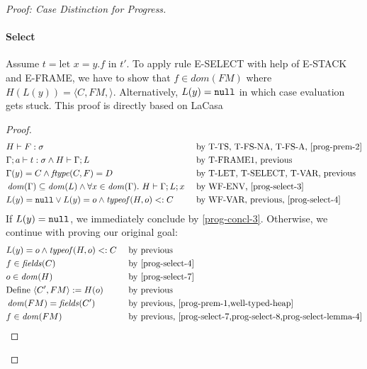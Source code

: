 \begin{proof}[Proof: Case Distinction for Progress]
\paragraph{Select}
Assume $t = \text{let } x = y.f \text{ in } t'$. To apply rule E-SELECT with help of E-STACK and E-FRAME, we have to show that $f \in dom(FM)$ where $H(L(y)) = \langle C, FM, \rangle$. Alternatively, $L(y) = \texttt{null}$ in which case evaluation gets stuck. This proof is directly based on LaCasa~\cite{haller_lacasa_2016}

\begin{proof}
\begin{alignat}{3}
    &H \vdash F : \sigma
        && \text{ by T-TS, T-FS-NA, T-FS-A, \cref{prog-prem-2}}\\
    &\Gamma; a \vdash t : \sigma
    \wedge H \vdash \Gamma; L \label{prog-select-3}
        && \text{ by T-FRAME1, previous}\\
    &\Gamma(y) = C
    \wedge \vn{ftype}(C, F) = D \label{prog-select-4}
        && \text{ by T-LET, T-SELECT, T-VAR, previous}\\
    &\vn{dom}(\Gamma) \subseteq \vn{dom}(L)
    \wedge \forall x \in \vn{dom}(\Gamma).\ H \vdash \Gamma; L; x
        && \text{ by WF-ENV, \cref{prog-select-3}}\\
    &L(y) = \mn{null} \vee L(y) = o \wedge \vn{typeof}(H, o) <: C
        && \text{ by WF-VAR, previous, \cref{prog-select-4}}
\end{alignat}
If $L(y) = \texttt{null}$, we immediately conclude by \cref{prog-concl-3}. Otherwise, we continue with proving our original goal:
\begin{alignat}{3}
    &L(y) = o \wedge \vn{typeof}(H, o) <: C \label{prog-select-7}
        && \text{ by previous}\\
    &f \in \vn{fields}(C) \label{prog-select-8}
        && \text{ by \cref{prog-select-4}}\\
    &o \in \vn{dom}(H) 
        && \text{ by \cref{prog-select-7}}\\
    &\text{Define } \langle C', FM \rangle := H(o)
        && \text{ by previous}\\
    &\vn{dom}(FM) = \vn{fields}(C')
        && \text{ by previous, \cref{prog-prem-1,well-typed-heap}}\\
    &f \in \vn{dom}(FM)
        && \text{ by previous, \cref{prog-select-7,prog-select-8,prog-select-lemma-4}}
\end{alignat}
\end{proof}


\end{proof}
